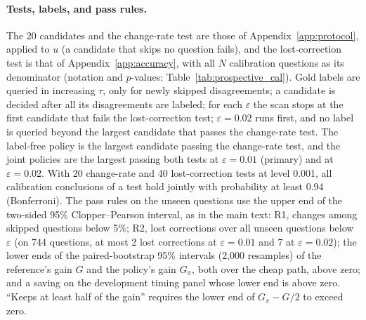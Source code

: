\paragraph{Tests, labels, and pass rules.} The 20 candidates and the change-rate test are those of Appendix~\ref{app:protocol}, applied to $u$ (a candidate that skips no question fails), and the lost-correction test is that of Appendix~\ref{app:accuracy}, with all $N$ calibration questions as its denominator (notation and $p$-values: Table~\ref{tab:prospective_cal}). Gold labels are queried in increasing $\tau$, only for newly skipped disagreements; a candidate is decided after all its disagreements are labeled; for each $\varepsilon$ the scan stops at the first candidate that fails the lost-correction test; $\varepsilon=0.02$ runs first, and no label is queried beyond the largest candidate that passes the change-rate test. The label-free policy is the largest candidate passing the change-rate test, and the joint policies are the largest passing both tests at $\varepsilon=0.01$ (primary) and at $\varepsilon=0.02$. With 20 change-rate and 40 lost-correction tests at level 0.001, all calibration conclusions of a test hold jointly with probability at least 0.94 (Bonferroni). The pass rules on the unseen questions use the upper end of the two-sided 95\% Clopper--Pearson interval, as in the main text: R1, changes among skipped questions below 5\%; R2, lost corrections over all unseen questions below $\varepsilon$ (on 744 questions, at most 2 lost corrections at $\varepsilon=0.01$ and 7 at $\varepsilon=0.02$); the lower ends of the paired-bootstrap 95\% intervals (2,000 resamples) of the reference's gain $G$ and the policy's gain $G_\pi$, both over the cheap path, above zero; and a saving on the development timing panel whose lower end is above zero. ``Keeps at least half of the gain'' requires the lower end of $G_\pi-G/2$ to exceed zero.

